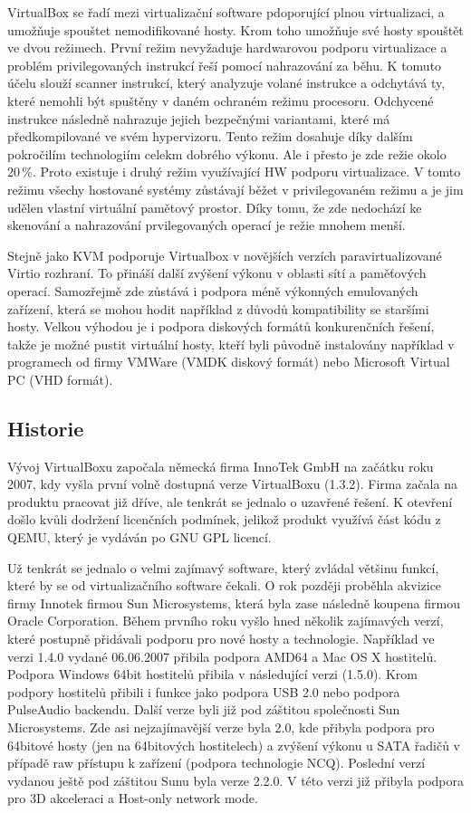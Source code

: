 VirtualBox se řadí mezi virtualizační software pdoporující plnou virtualizaci, a umožňuje spouštet nemodifikované hosty. Krom toho umožňuje své hosty spouštět ve dvou režimech. První režim nevyžaduje hardwarovou podporu virtualizace a problém privilegovaných instrukcí řeší pomocí nahrazování za běhu. K tomuto účelu slouží scanner instrukcí, který analyzuje volané instrukce a odchytává ty, které nemohli být spuštěny v daném ochraném režimu procesoru. Odchycené instrukce následně nahrazuje jejich bezpečnými variantami, které má předkompilované ve svém hypervizoru. Tento režim dosahuje díky dalším pokročilím technologiím celekm dobrého výkonu. Ale i přesto je zde režie okolo 20\,\%. Proto existuje i druhý režim využívající HW podporu virtualizace. V tomto režimu všechy hostované systémy zůstávají běžet v privilegovaném režimu a je jim udělen vlastní virtuální pamětový prostor. Díky tomu, že zde nedochází ke skenování a nahrazování prvilegovaných operací je režie mnohem menší.

Stejně jako KVM podporuje Virtualbox v novějších verzích paravirtualizované Virtio rozhraní. To přináší další zvýšení výkonu v oblasti sítí a paměťových operací. Samozřejmě zde zůstává i podpora méně výkonných emulovaných zařízení, která se mohou hodit například z důvodů kompatibility se staršími hosty. Velkou výhodou je i podpora diskových formátů konkurenčních řešení, takže je možné pustit virtuální hosty, kteří byli původně instalovány například v programech od firmy VMWare (VMDK diskový formát) nebo Microsoft Virtual PC (VHD formát).

\subsection{Historie}

Vývoj VirtualBoxu započala německá firma InnoTek GmbH na začátku roku 2007, kdy vyšla první volně dostupná verze VirtualBoxu (1.3.2). Firma začala na produktu pracovat již dříve, ale tenkrát se jednalo o uzavřené řešení. K otevření došlo kvůli dodržení licenčních podmínek, jelikož produkt využívá část kódu z QEMU, který je vydáván po GNU GPL licencí.

Už tenkrát se jednalo o velmi zajímavý software, který zvládal většinu funkcí, které by se od virtualizačního software čekali. O rok později proběhla akvizice firmy Innotek firmou Sun Microsystems, která byla zase následně koupena firmou Oracle Corporation.
Během prvního roku vyšlo hned několik zajímavých verzí, které postupně přidávali podporu pro nové hosty a technologie. Například ve verzi 1.4.0 vydané 06.06.2007 přibila podpora AMD64 a Mac OS X hostitelů. Podpora Windows 64bit hostitelů přibila v následující verzi (1.5.0). Krom podpory hostitelů přibili i funkce jako podpora USB 2.0 nebo podpora PulseAudio backendu. Další verze byli již pod záštitou společnosti Sun Microsystems. Zde asi nejzajímavější verze byla 2.0, kde přibyla podpora pro 64bitové hosty (jen na 64bitových hostitelech) a zvýšení výkonu u SATA řadičů v případě raw přístupu k zařízení (podpora technologie NCQ). Poslední verzí vydanou ještě pod záštitou Sunu byla verze 2.2.0. V této verzi již přibyla podpora pro 3D akceleraci a Host-only network mode.

